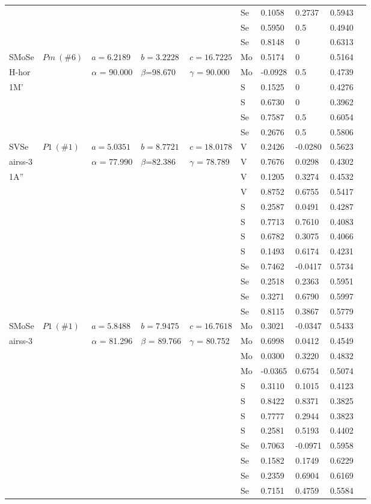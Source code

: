 \documentclass[a4paperm]{article}
\begin{document}
\begin{table}[H]
\begin{tabular}{l*{9}{l}}
		&&&&&	Se	&	0.1058	&	0.2737	&	0.5943	\\
		&&&&&	Se	&	0.5950	&	0.5		&	0.4940	\\
		&&&&&	Se	&	0.8148	&	0		&	0.6313	\\
		\hline 
		SMoSe & $Pm\ (\#6)$  &	$a=6.2189$ & $b=3.2228$ & $c=16.7225$  & Mo	&	0.5174	&	0	&	0.5164	\\
		H-hor&   &$\alpha$ = 90.000& $\beta$=98.670& $\gamma$ = 90.000& Mo	&	-0.0928	&	0.5	&	0.4739	\\
		1M'&&&&& S	&	0.1525	&	0	&	0.4276	\\
		&&&&& S	&	0.6730	&	0	&	0.3962	\\
		&&&&& Se	&	0.7587	&	0.5	&	0.6054	\\
		&&&&& Se	&	0.2676	&	0.5	&	0.5806	\\
		\hline
		SVSe & $P1\ (\#1)$  &	$a=5.0351$ & $b=8.7721$ & $c=18.0178$  & V	&	0.2426	&	-0.0280	&	0.5623	\\
		airss-3&&$\alpha$ = 77.990& $\beta$=82.386& $\gamma$ = 78.789  & V	&	0.7676	&	0.0298	&	0.4302	\\		
		1A''&&&&&	V	&	0.1205	&	0.3274	&	0.4532	\\
		&&&&&	V	&	0.8752	&	0.6755	&	0.5417	\\
		&&&&&	S	&	0.2587	&	0.0491	&	0.4287	\\
		&&&&&	S	&	0.7713	&	0.7610	&	0.4083	\\
		&&&&&	S	&	0.6782	&	0.3075	&	0.4066	\\
		&&&&&	S	&	0.1493	&	0.6174	&	0.4231	\\
		&&&&&	Se	&	0.7462	&	-0.0417	&	0.5734	\\
		&&&&&	Se	&	0.2518	&	0.2363	&	0.5951	\\
		&&&&&	Se	&	0.3271	&	0.6790	&	0.5997	\\
		&&&&&	Se	&	0.8115	&	0.3867	&	0.5779	\\
		\hline
		SMoSe & $P1\ (\#1)$  &	$a=5.8488$ & $b=7.9475$ & $c=16.7618$  & Mo	&	0.3021	&	-0.0347	&	0.5433	\\
		airss-3&&$\alpha$ = 81.296& $\beta$ = 89.766& $\gamma$ = 80.752  & Mo	&	0.6998	&	0.0412	&	0.4549	\\		
		&&&&&	Mo	&	0.0300	&	0.3220	&	0.4832	\\
		&&&&&	Mo	&	-0.0365	&	0.6754	&	0.5074	\\
		&&&&&	S	&	0.3110	&	0.1015	&	0.4123	\\
		&&&&&	S	&	0.8422	&	0.8371	&	0.3825	\\
		&&&&&	S	&	0.7777	&	0.2944	&	0.3823	\\
		&&&&&	S	&	0.2581	&	0.5193	&	0.4402	\\
		&&&&&	Se	&	0.7063	&	-0.0971	&	0.5958	\\
		&&&&&	Se	&	0.1582	&	0.1749	&	0.6229	\\
		&&&&&	Se	&	0.2359	&	0.6904	&	0.6169	\\
		&&&&&	Se	&	0.7151	&	0.4759	&	0.5584	\\
		\hline
	\end{tabular}
\end{table}
\end{document}
